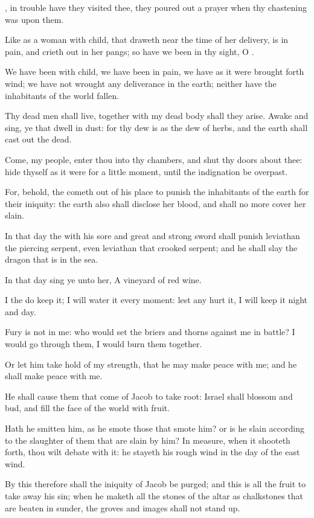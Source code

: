 \Verse \LORD, in trouble have they visited thee, they poured out a prayer when thy chastening was upon them.

\Verse Like as a woman with child, that draweth near the time of her delivery, is in pain, and crieth out in her pangs; so have we been in thy sight, O \LORD.

\Verse We have been with child, we have been in pain, we have as it were brought forth wind; we have not wrought any deliverance in the earth; neither have the inhabitants of the world fallen.

\Verse Thy dead men shall live, together with my dead body shall they arise. Awake and sing, ye that dwell in dust: for thy dew is as the dew of herbs, and the earth shall cast out the dead.

\Verse Come, my people, enter thou into thy chambers, and shut thy doors about thee: hide thyself as it were for a little moment, until the indignation be overpast.

\Verse For, behold, the \LORD cometh out of his place to punish the inhabitants of the earth for their iniquity: the earth also shall disclose her blood, and shall no more cover her slain.


\Chapter
\Verse In that day the \LORD with his sore and great and strong sword shall punish leviathan the piercing serpent, even leviathan that crooked serpent; and he shall slay the dragon that is in the sea.

\Verse In that day sing ye unto her, A vineyard of red wine.

\Verse I the \LORD do keep it; I will water it every moment: lest any hurt it, I will keep it night and day.

\Verse Fury is not in me: who would set the briers and thorns against me in battle? I would go through them, I would burn them together.

\Verse Or let him take hold of my strength, that he may make peace with me; and he shall make peace with me.

\Verse He shall cause them that come of Jacob to take root: Israel shall blossom and bud, and fill the face of the world with fruit.

\Verse Hath he smitten him, as he smote those that smote him? or is he slain according to the slaughter of them that are slain by him?  \Verse In measure, when it shooteth forth, thou wilt debate with it: he stayeth his rough wind in the day of the east wind.

\Verse By this therefore shall the iniquity of Jacob be purged; and this is all the fruit to take away his sin; when he maketh all the stones of the altar as chalkstones that are beaten in sunder, the groves and images shall not stand up.

